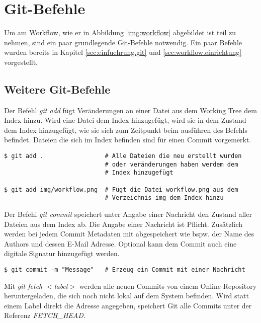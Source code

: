 \section{Git-Befehle}
\label{sec:git-commands}

Um am Workflow, wie er in Abbildung \ref{img:workflow} abgebildet ist teil zu nehmen, sind ein paar grundlegende Git-Befehle notwendig. Ein paar Befehle wurden bereits in Kapitel \ref{sec:einfuehrung.git} und \ref{sec:workflow.einrichtung} vorgestellt.

\subsection{Weitere Git-Befehle}
\label{sec:git-commands.advanced}

\label{sec:git-commands.advanced.add}
Der Befehl \textit{git add} fügt Veränderungen an einer Datei aus dem Working Tree dem Index hinzu. Wird eine Datei dem Index hinzugefügt, wird sie in dem Zustand dem Index hinzugefügt, wie sie sich zum Zeitpunkt beim ausführen des Befehls befindet. Dateien die sich im Index befinden sind für einen Commit vorgemerkt. 

\begin{verbatim}
$ git add .                 # Alle Dateien die neu erstellt wurden 
                            # oder veränderungen haben werdem dem 
                            # Index hinzugefügt
                            
$ git add img/workflow.png  # Fügt die Datei workflow.png aus dem 
                            # Verzeichnis img dem Index hinzu
\end{verbatim}

\label{sec:git-commands.advanced.commit}
Der Befehl \textit{git commit} speichert unter Angabe einer Nachricht den Zustand aller Dateien aus dem Index ab. Die Angabe einer Nachricht ist Pflicht. Zusätzlich werden bei jedem Commit Metadaten mit abgespeichert wie bspw. der Name des Authors und dessen E-Mail Adresse. Optional kann dem Commit auch eine digitale Signatur hinzugefügt werden.

\begin{verbatim}
$ git commit -m "Message"   # Erzeug ein Commit mit einer Nachricht
\end{verbatim}

\label{sec:git-commands.advanced.fetch}
Mit \textit{git fetch $ < $label$ > $} werden alle neuen Commits von einem Online-Repository heruntergeladen, die sich noch nicht lokal auf dem System befinden. Wird statt einem Label direkt die Adresse angegeben, speichert Git alle Commits unter der Referenz \textit{FETCH\_HEAD}.


